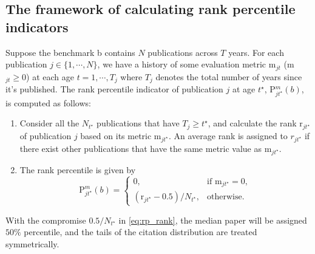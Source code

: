 \subsection*{The framework of calculating rank percentile indicators}
Suppose the benchmark b contains $N$ publications across $T$ years. For each publication $j\in\{1,\cdots,N\}$, we have a history of some evaluation metric m$_{jt}$ (m$_{jt} \ge 0$) at each age $t=1,\cdots,T_j$ where $T_j$ denotes the total number of years since it's published. The rank percentile indicator of publication $j$ at age $t^\star$, P$_{jt^\star}^{m}(b)$, is computed as follows:
\begin{enumerate}[label=(\arabic*)]
    \item Consider all the $N_{t^\star}$ publications that have $T_j \ge t^\star$, and calculate the rank r$_{jt^\star}$ of publication $j$ based on its metric m$_{jt^\star}$. An average rank is assigned to $r_{jt^\star}$ if there exist other publications that have the same metric value as m$_{jt^\star}$. 
    \item The rank percentile is given by
        \begin{equation}
        \label{eq:rp_rank}
            \text{P}_{j t^\star}^{m}(b) = 
                \begin{cases} 
                    0, & \mbox{if } \text{m}_{j t^\star}=0, \\ 
                    (\text{r}_{j t^\star}-0.5)/N_{t^\star}, & \mbox{otherwise}.
                \end{cases}
        \end{equation}
\end{enumerate}
With the compromise $0.5/N_{t^\star}$ in \eqref{eq:rp_rank}, the median paper will be assigned $50\%$ percentile, and the tails of the citation distribution are treated symmetrically\supercite{allen1914storage}.

